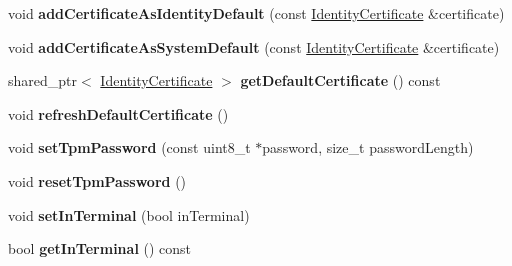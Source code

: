\begin{DoxyCompactItemize}
\item 
void {\bfseries add\+Certificate\+As\+Identity\+Default} (const \hyperlink{classndn_1_1IdentityCertificate}{Identity\+Certificate} \&certificate)\hypertarget{classndn_1_1security_1_1KeyChain_a12262ebf5c75bf213ff11e899ab7ef5f}{}\label{classndn_1_1security_1_1KeyChain_a12262ebf5c75bf213ff11e899ab7ef5f}

\item 
void {\bfseries add\+Certificate\+As\+System\+Default} (const \hyperlink{classndn_1_1IdentityCertificate}{Identity\+Certificate} \&certificate)\hypertarget{classndn_1_1security_1_1KeyChain_a3105d61472dbe12283391f7fc7d0e144}{}\label{classndn_1_1security_1_1KeyChain_a3105d61472dbe12283391f7fc7d0e144}

\item 
shared\+\_\+ptr$<$ \hyperlink{classndn_1_1IdentityCertificate}{Identity\+Certificate} $>$ {\bfseries get\+Default\+Certificate} () const\hypertarget{classndn_1_1security_1_1KeyChain_ae1391dba27ad08360d40fe31eb47b1b3}{}\label{classndn_1_1security_1_1KeyChain_ae1391dba27ad08360d40fe31eb47b1b3}

\item 
void {\bfseries refresh\+Default\+Certificate} ()\hypertarget{classndn_1_1security_1_1KeyChain_ab5e27a0258642941f0dd10f388f9ad7e}{}\label{classndn_1_1security_1_1KeyChain_ab5e27a0258642941f0dd10f388f9ad7e}

\item 
void {\bfseries set\+Tpm\+Password} (const uint8\+\_\+t $\ast$password, size\+\_\+t password\+Length)\hypertarget{classndn_1_1security_1_1KeyChain_a250ccabafaf1229d0c94ae07ddd08cfe}{}\label{classndn_1_1security_1_1KeyChain_a250ccabafaf1229d0c94ae07ddd08cfe}

\item 
void {\bfseries reset\+Tpm\+Password} ()\hypertarget{classndn_1_1security_1_1KeyChain_ab770610f08c3c2a9a32534ce064c5f1d}{}\label{classndn_1_1security_1_1KeyChain_ab770610f08c3c2a9a32534ce064c5f1d}

\item 
void {\bfseries set\+In\+Terminal} (bool in\+Terminal)\hypertarget{classndn_1_1security_1_1KeyChain_afcf4bb8280896b1f95a6c83fff6771f2}{}\label{classndn_1_1security_1_1KeyChain_afcf4bb8280896b1f95a6c83fff6771f2}

\item 
bool {\bfseries get\+In\+Terminal} () const\hypertarget{classndn_1_1security_1_1KeyChain_a7ecbbb2b93675f82927758d6b8f594a2}{}\label{classndn_1_1security_1_1KeyChain_a7ecbbb2b93675f82927758d6b8f594a2}


\end{DoxyCompactItemize}
